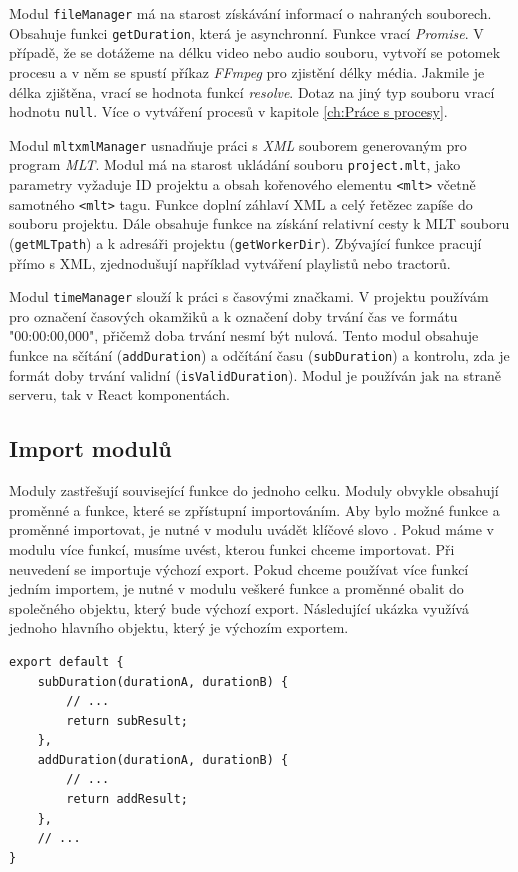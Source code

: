Modul \texttt{fileManager} má na starost získávání informací o nahraných souborech. Obsahuje funkci \texttt{getDuration}, která je asynchronní. Funkce vrací \textit{Promise}. V případě, že se dotážeme na délku video nebo audio souboru, vytvoří se potomek procesu a v něm se spustí příkaz \textit{FFmpeg} pro zjistění délky média. Jakmile je délka zjištěna, vrací se hodnota funkcí \textit{resolve}. Dotaz na jiný typ souboru vrací hodnotu \texttt{null}. Více o vytváření procesů v kapitole \ref{ch:Práce s procesy}.

Modul \texttt{mltxmlManager} usnadňuje práci s \textit{XML} souborem generovaným pro program \textit{MLT}. Modul má na starost ukládání souboru \texttt{project.mlt}, jako parametry vyžaduje ID projektu a obsah kořenového elementu \texttt{<mlt>} včetně samotného \texttt{<mlt>} tagu. Funkce doplní záhlaví XML a celý řetězec zapíše do souboru projektu. Dále obsahuje funkce na získání relativní cesty k MLT souboru (\texttt{getMLTpath}) a k adresáři projektu (\texttt{getWorkerDir}). Zbývající funkce pracují přímo s XML, zjednodušují například vytváření playlistů nebo tractorů.

Modul \texttt{timeManager} slouží k práci s časovými značkami. V projektu používám pro označení časových okamžiků a k označení doby trvání čas ve formátu "00:00:00,000", přičemž doba trvání nesmí být nulová. Tento modul obsahuje funkce na sčítání (\texttt{addDuration}) a odčítání času (\texttt{subDuration}) a kontrolu, zda je formát doby trvání validní (\texttt{isValidDuration}). Modul je používán jak na straně serveru, tak v React komponentách.

\subsection{Import modulů}
Moduly zastřešují související funkce do jednoho celku. Moduly obvykle obsahují proměnné a funkce, které se zpřístupní importováním. Aby bylo možné funkce a proměnné importovat, je nutné v modulu uvádět klíčové slovo . Pokud máme v modulu více funkcí, musíme uvést, kterou funkci chceme importovat. Při neuvedení se importuje výchozí export. Pokud chceme používat více funkcí jedním importem, je nutné v modulu veškeré funkce a proměnné obalit do společného objektu, který bude výchozí export. Následující ukázka využívá jednoho hlavního objektu, který je výchozím exportem.
\begin{lstlisting}[style=JavaScript]
export default {
    subDuration(durationA, durationB) {
        // ...
        return subResult;
    },
    addDuration(durationA, durationB) {
        // ...
        return addResult;
    },
    // ...
}
\end{lstlisting}

